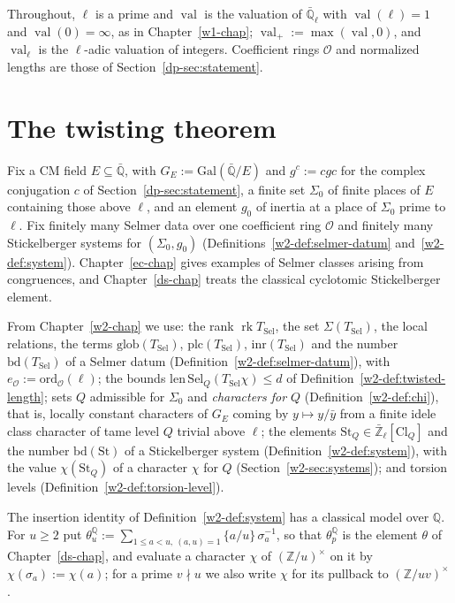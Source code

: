 \documentclass[reqno]{amsart}
\newcounter{chap}
\theoremstyle{definition}
\theoremstyle{plain}
\newcommand{\Z}{\mathbb{Z}}
\newcommand{\Q}{\mathbb{Q}}
\newcommand{\Ql}{\bar{\mathbb{Q}}_\ell}
\newcommand{\Zl}{\bar{\mathbb{Z}}_\ell}
\newcommand{\Sel}{\mathrm{Sel}}
\newcommand{\val}{\operatorname{val}}
\newcommand{\Oc}{\mathcal{O}}
\newcommand{\St}{\mathrm{St}}
\newcommand{\bd}{\mathrm{bd}}
\newcommand{\TS}{T_{\mathrm{Sel}}}
\begin{document}
Throughout, \(\ell\) is a prime and \(\val\) is the valuation of \(\Ql\) with \(\val(\ell) = 1\) and \(\val(0) = \infty\), as in Chapter~\ref{w1-chap}; \(\val_+ := \max(\val, 0)\), and \(\val_\ell\) is the \(\ell\)-adic valuation of integers.  Coefficient rings \(\Oc\) and normalized lengths are those of Section~\ref{dp-sec:statement}.

\section{The twisting theorem}\label{sec:twisting}

Fix a CM field \(E\subseteq\bar{\Q}\), with \(G_E := \mathrm{Gal}(\bar{\Q}/E)\) and \(g^c := cgc\) for the complex conjugation \(c\) of Section~\ref{dp-sec:statement}, a finite set \(\Sigma_0\) of finite places of \(E\) containing those above \(\ell\), and an element \(g_0\) of inertia at a place of \(\Sigma_0\) prime to \(\ell\).  Fix finitely many Selmer data over one coefficient ring \(\Oc\) and finitely many Stickelberger systems for \((\Sigma_0, g_0)\) (Definitions~\ref{w2-def:selmer-datum} and~\ref{w2-def:system}).  Chapter~\ref{ec-chap} gives examples of Selmer classes arising from congruences, and Chapter~\ref{ds-chap} treats the classical cyclotomic Stickelberger element.

From Chapter~\ref{w2-chap} we use: the rank \(\operatorname{rk}\TS\), the set \(\Sigma(\TS)\), the local relations, the terms \(\mathrm{glob}(\TS)\), \(\mathrm{plc}(\TS)\), \(\mathrm{inr}(\TS)\) and the number \(\bd(\TS)\) of a Selmer datum (Definition~\ref{w2-def:selmer-datum}), with \(e_{\Oc} := \mathrm{ord}_{\Oc}(\ell)\); the bounds \(\mathrm{len}\,\Sel_Q(\TS\chi) \le d\) of Definition~\ref{w2-def:twisted-length}; sets \(Q\) admissible for \(\Sigma_0\) and \emph{characters for \(Q\)} (Definition~\ref{w2-def:chi}), that is, locally constant characters of \(G_E\) coming by \(y \mapsto y/\bar y\) from a finite idele class character of tame level \(Q\) trivial above \(\ell\); the elements \(\St_Q \in \Zl[\mathrm{Cl}_Q]\) and the number \(\bd(\St)\) of a Stickelberger system (Definition~\ref{w2-def:system}), with the value \(\chi(\St_Q)\) of a character \(\chi\) for \(Q\) (Section~\ref{w2-sec:systems}); and torsion levels (Definition~\ref{w2-def:torsion-level}).

The insertion identity of Definition~\ref{w2-def:system} has a classical model over \(\Q\).  For \(u \ge 2\) put \(\theta^{\Q}_u := \sum_{1 \le a < u,\ (a,u)=1}\{a/u\}\,\sigma_a^{-1}\), so that \(\theta^{\Q}_p\) is the element \(\theta\) of Chapter~\ref{ds-chap}, and evaluate a character \(\chi\) of \((\Z/u)^\times\) on it by \(\chi(\sigma_a) := \chi(a)\); for a prime \(v \nmid u\) we also write \(\chi\) for its pullback to \((\Z/uv)^\times\).
\end{document}
